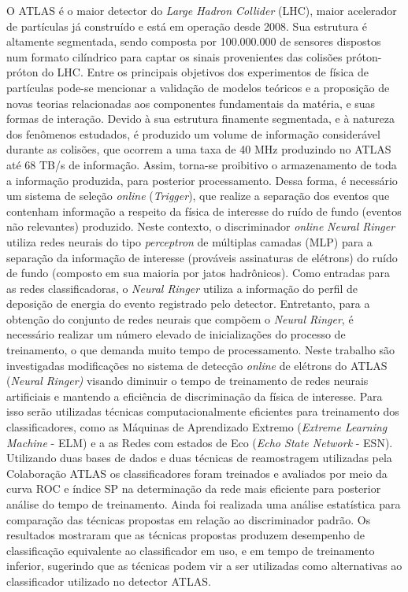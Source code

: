 \begin{resumo}

O ATLAS é o maior detector do \textit{Large Hadron Collider} (LHC), maior acelerador de partículas já construído e está em operação desde 2008. Sua estrutura é altamente segmentada, sendo composta por 100.000.000 de sensores dispostos num formato cilíndrico para captar os sinais provenientes das colisões próton-próton do LHC. Entre os principais objetivos dos experimentos de física de partículas pode-se mencionar a validação de modelos teóricos e a proposição de novas teorias relacionadas aos componentes fundamentais da matéria, e suas formas de interação. Devido à sua estrutura finamente segmentada, e à natureza dos fenômenos estudados, é produzido um volume de informação considerável durante as colisões, que ocorrem a uma taxa de 40 MHz produzindo no ATLAS até 68 TB/s de informação. Assim, torna-se proibitivo o armazenamento de toda a informação produzida, para posterior processamento. Dessa forma, é necessário um sistema de seleção \textit{online} (\textit{Trigger}), que realize a separação dos eventos que contenham informação a respeito da física de interesse do ruído de fundo (eventos não relevantes) produzido. Neste contexto, o discriminador \textit{online} \textit{Neural Ringer} utiliza redes neurais do tipo \textit{perceptron} de múltiplas camadas (MLP) para a separação da informação de interesse (prováveis assinaturas de elétrons) do ruído de fundo (composto em sua maioria por jatos hadrônicos). Como entradas para as redes classificadoras, o \textit{Neural Ringer} utiliza a informação do perfil de deposição de energia do evento registrado pelo detector. Entretanto, para a obtenção do conjunto de redes neurais que compõem o \textit{Neural Ringer}, é necessário realizar um número elevado de inicializações do processo de treinamento, o que demanda muito tempo de processamento. Neste trabalho são investigadas modificações no sistema de detecção \textit{online} de elétrons do ATLAS (\textit{Neural Ringer)} visando diminuir o tempo de treinamento de redes neurais artificiais e mantendo a eficiência de discriminação da física de interesse. Para isso serão utilizadas técnicas computacionalmente eficientes para treinamento dos classificadores, como as Máquinas de Aprendizado Extremo (\textit{Extreme Learning Machine} - ELM) e a as Redes com estados de Eco (\textit{Echo State Network} - ESN). Utilizando duas bases de dados e duas técnicas de reamostragem utilizadas pela Colaboração ATLAS os classificadores foram treinados e avaliados por meio da curva ROC e índice SP na determinação da rede mais eficiente para posterior análise do tempo de treinamento. Ainda foi realizada uma análise estatística para comparação das técnicas propostas em relação ao discriminador padrão. Os resultados mostraram que as técnicas propostas produzem desempenho de classificação equivalente ao classificador em uso, e em tempo de treinamento inferior, sugerindo que as técnicas podem vir a ser utilizadas como alternativas ao classificador utilizado no detector ATLAS.
	

\end{resumo}
